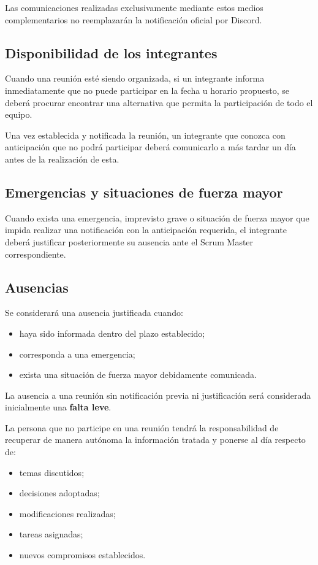 \documentclass[12pt,a4paper]{article}
\begin{document}
Las comunicaciones realizadas exclusivamente mediante estos medios
complementarios no reemplazarán la notificación oficial por Discord.

\subsection{Disponibilidad de los integrantes}

Cuando una reunión esté siendo organizada, si un integrante informa inmediatamente que no puede participar en la fecha u horario propuesto, se deberá procurar encontrar una alternativa que permita la participación de todo el equipo.

Una vez establecida y notificada la reunión, un integrante que conozca con anticipación que no podrá participar deberá comunicarlo a más tardar un día antes de la realización de esta.

\subsection{Emergencias y situaciones de fuerza mayor}

Cuando exista una emergencia, imprevisto grave o situación de fuerza mayor que impida realizar una notificación con la anticipación requerida, el integrante deberá justificar posteriormente su ausencia ante el Scrum Master correspondiente.
\subsection{Ausencias}

Se considerará una ausencia justificada cuando:

\begin{itemize}
    \item haya sido informada dentro del plazo establecido;
    \item corresponda a una emergencia;
    \item exista una situación de fuerza mayor debidamente comunicada.
\end{itemize}

La ausencia a una reunión sin notificación previa ni justificación será considerada inicialmente una \textbf{falta leve}.

La persona que no participe en una reunión tendrá la responsabilidad de recuperar de manera autónoma la información tratada y ponerse al día respecto de:

\begin{itemize}
    \item temas discutidos;
    \item decisiones adoptadas;
    \item modificaciones realizadas;
    \item tareas asignadas;
    \item nuevos compromisos establecidos.
\end{itemize}
\end{document}
